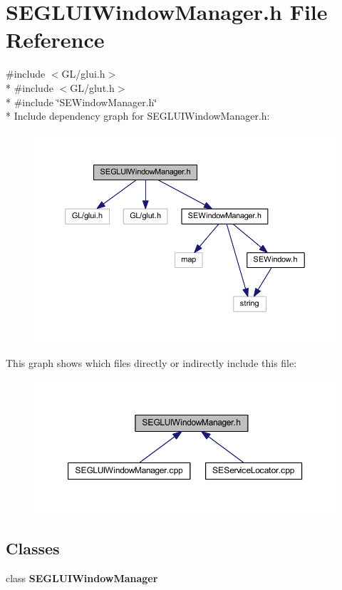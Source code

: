 \section{S\+E\+G\+L\+U\+I\+Window\+Manager.\+h File Reference}
\label{_s_e_g_l_u_i_window_manager_8h}
{\ttfamily \#include $<$G\+L/glui.\+h$>$}\\*
{\ttfamily \#include $<$G\+L/glut.\+h$>$}\\*
{\ttfamily \#include \char`\"{}S\+E\+Window\+Manager.\+h\char`\"{}}\\*
Include dependency graph for S\+E\+G\+L\+U\+I\+Window\+Manager.\+h\+:
\nopagebreak
\begin{figure}[H]
\begin{center}
\leavevmode
\includegraphics[width=350pt]{_s_e_g_l_u_i_window_manager_8h__incl}
\end{center}
\end{figure}
This graph shows which files directly or indirectly include this file\+:
\nopagebreak
\begin{figure}[H]
\begin{center}
\leavevmode
\includegraphics[width=350pt]{_s_e_g_l_u_i_window_manager_8h__dep__incl}
\end{center}
\end{figure}
\subsection*{Classes}
\begin{DoxyCompactItemize}
\item 
class {\bf S\+E\+G\+L\+U\+I\+Window\+Manager}
\end{DoxyCompactItemize}
